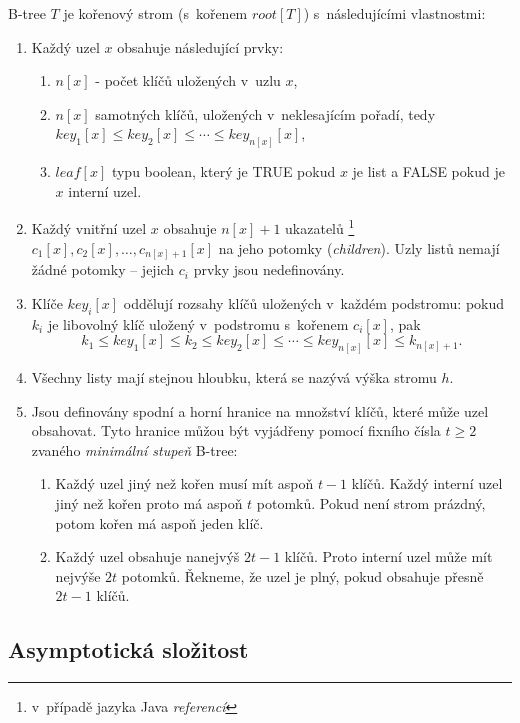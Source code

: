 B-tree $T$ je kořenový strom (s~kořenem $root[T]$) s~následujícími
vlastnostmi:
\begin{enumerate}
\item Každý uzel $x$ obsahuje následující prvky:

\begin{enumerate}
\item $n[x]$ - počet klíčů uložených v~uzlu $x$,
\item $n[x]$ samotných klíčů, uložených v~neklesajícím pořadí, tedy $key_{1}[x]\leq key_{2}[x]\leq\cdots\leq key_{n[x]}[x]$,
\item $leaf[x]$ typu boolean, který je TRUE pokud $x$ je list a FALSE
pokud je $x$ interní uzel\@.
\end{enumerate}
\item Každý vnitřní uzel $x$ obsahuje $n[x]+1$ ukazatelů%
\footnote{v~případě jazyka Java \emph{referencí}%
} $c_{1}[x],c_{2}[x],\ldots,c_{n[x]+1}[x]$ na jeho potomky (\emph{children})\@.
Uzly listů nemají žádné potomky -- jejich $c_{i}$ prvky jsou nedefinovány\@.
\item Klíče $key_{i}[x]$ oddělují rozsahy klíčů uložených v~každém podstromu:
pokud $k_{i}$ je libovolný klíč uložený v~podstromu s~kořenem $c_{i}[x]$,
pak
\[
k_{1}\leq key_{1}[x]\leq k_{2}\leq key_{2}[x]\leq\cdots\leq key_{n[x]}[x]\leq k_{n[x]+1}.
\]

\item Všechny listy mají stejnou hloubku, která se nazývá výška stromu $h$\@.
\item Jsou definovány spodní a horní hranice na množství klíčů, které může
uzel obsahovat\@. Tyto hranice můžou být vyjádřeny pomocí fixního
čísla $t\geq2$ zvaného \emph{minimální stupeň} B-tree:

\begin{enumerate}
\item Každý uzel jiný než kořen musí mít aspoň $t-1$ klíčů\@. Každý interní
uzel jiný než kořen proto má aspoň $t$ potomků\@. Pokud není strom
prázdný, potom kořen má aspoň jeden klíč\@.
\item Každý uzel obsahuje nanejvýš $2t-1$ klíčů\@. Proto interní uzel
může mít nejvýše $2t$ potomků\@. Řekneme, že uzel je plný, pokud
obsahuje přesně $2t-1$ klíčů\@.
\end{enumerate}
\end{enumerate}

\subsection{Asymptotická složitost}

